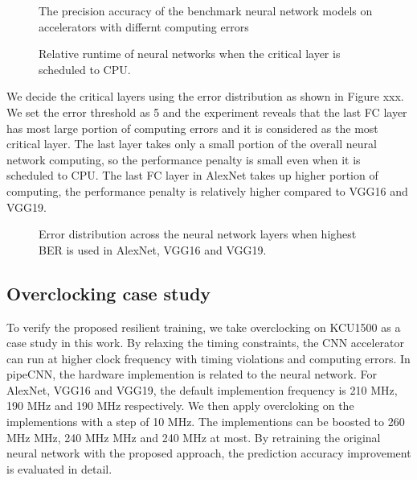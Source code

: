 \begin{figure}
        \center
        \qquad
        \qquad
        \caption{The precision accuracy of the benchmark neural network models on accelerators with differnt computing errors}
        \label{fig:softerror-accuracy}
\end{figure}

\begin{figure}
        \caption{Relative runtime of neural networks when the critical layer is scheduled to CPU.}
        \label{fig:clp_perf}
\end{figure}

We decide the critical layers using the error distribution as shown in Figure xxx.
We set the error threshold as 5 and the experiment reveals that the last FC 
layer has most large portion of computing errors and it is considered as 
the most critical layer. The last layer takes only a small portion of the overall 
neural network computing, so the performance penalty is small even 
when it is scheduled to CPU. The last FC layer in AlexNet takes up higher portion of computing, 
the performance penalty is relatively higher compared to VGG16 and VGG19.
\begin{figure*}
        \caption{Error distribution across the neural network layers when highest BER is used in AlexNet, VGG16 and VGG19.}
        \label{fig:clp_perf}
\end{figure*}


\subsection{Overclocking case study}
To verify the proposed resilient training, we take overclocking on KCU1500 as a case 
study in this work. By relaxing the timing constraints, the CNN accelerator can 
run at higher clock frequency with timing violations and computing errors. In pipeCNN, the 
hardware implemention is related to the neural network. For AlexNet, VGG16 and VGG19, the 
default implemention frequency is 210 MHz, 190 MHz and 190 MHz respectively. We then apply overcloking 
on the implementions with a step of 10 MHz. The implementions can be boosted to 
260 MHz MHz, 240 MHz MHz and 240 MHz at most. By retraining the original neural network with 
the proposed approach, the prediction accuracy improvement is evaluated in detail.

